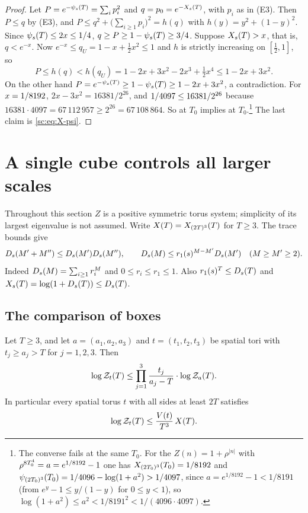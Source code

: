 \begin{proof}
Let $P=e^{-\psi_{s}(T)}=\sum_ip_i^2$ and $q=p_0=e^{-X_{s}(T)}$, with $p_i$ as in (E3). Then $P\le q$ by (E3), and $P\le q^2+\bigl(\sum_{i\ge1}p_i\bigr)^2=h(q)$ with $h(y)=y^2+(1-y)^2$. Since $\psi_{s}(T)\le2x\le1/4$, $q\ge P\ge1-\psi_{s}(T)\ge3/4$. Suppose $X_{s}(T)>x$, that is, $q<e^{-x}$. Now $e^{-x}\le q_U=1-x+\frac12x^2\le1$ and $h$ is strictly increasing on $[\frac12,1]$, so
\[
P\le h(q)<h(q_U)=1-2x+3x^2-2x^3+\tfrac12x^4\le1-2x+3x^2 .
\]
On the other hand $P=e^{-\psi_{s}(T)}\ge1-\psi_{s}(T)\ge1-2x+3x^2$, a contradiction. For $x=1/8192$, $2x-3x^2=16381/2^{26}$, and $1/4097\le16381/2^{26}$ because $16381\cdot4097=67\,112\,957\ge2^{26}=67\,108\,864$. So \Mcirc{} at $T_0$ implies \Bcirc{} at $T_0$.\footnote{The converse fails at the same $T_0$. For the \PSTS{} $Z(n)=1+\rho^{|n|}$ with $\rho^{8T_0^4}=a=e^{1/8192}-1$ one has $X_{(2T_0)^3}(T_0)=1/8192$ and $\psi_{(2T_0)^3}(T_0)=1/4096-\log(1+a^2)>1/4097$, since $a=e^{1/8192}-1<1/8191$ (from $e^y-1\le y/(1-y)$ for $0\le y<1$), so $\log(1+a^2)\le a^2<1/8191^2<1/(4096\cdot4097)$.} The last claim is \eqref{sc:eq:X-psi}.
\end{proof}
\section{A single cube controls all larger scales}\label{sc:sec:ascent}
Throughout this section $Z$ is a positive symmetric torus system; simplicity
of its largest eigenvalue is not assumed. Write
$X(T)=X_{(2T)^3}(T)$ for $T\ge3$. The trace bounds give
\begin{equation}\label{sc:eq:gap-step}
D_{s}(M'+M'')\le D_{s}(M')D_{s}(M''),\qquad
D_{s}(M)\le r_1(s)^{M-M'}D_{s}(M')\quad(M\ge M'\ge2).
\end{equation}
Indeed $D_{s}(M)=\sum_{i\ge1}r_i^{M}$ and $0\le r_i\le r_1\le1$.
Also $r_1(s)^T\le D_{s}(T)$ and
$X_{s}(T)=\log(1+D_{s}(T))\le D_{s}(T)$.

\subsection{The comparison of boxes}
\begin{theorem}\label{sc:thm:cube-control}
Let $T\ge3$, and let $a=(a_1,a_2,a_3)$ and $t=(t_1,t_2,t_3)$ be spatial tori with $t_j\ge a_j>T$ for $j=1,2,3$. Then
\begin{equation}\label{sc:eq:box-control}
\log\mathcal Z_{t}(T)\le\prod_{j=1}^3\frac{t_j}{a_j-T}\cdot\log\mathcal Z_{a}(T).
\end{equation}
In particular every spatial torus $t$ with all sides at least $2T$ satisfies
\begin{equation}\label{sc:eq:cube-control}
\log\mathcal Z_{t}(T)\le\frac{V(t)}{T^3}\,X(T).
\end{equation}
\end{theorem}

